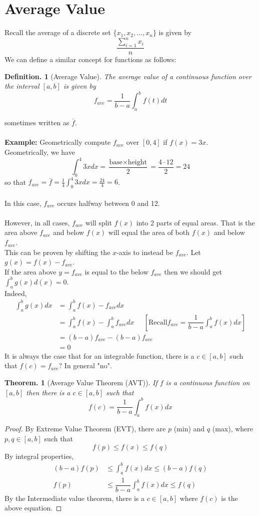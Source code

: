 \documentclass[11pt, a4paper]{memoir}
\theoremstyle{change}
\newtheorem{theorem}{Theorem.}[section]
\theoremstyle{plain}
\theoremstyle{nonumberplain}
\newtheorem{definition}{Definition.}
\newtheorem{proof}{Proof}
\numberwithin{equation}{section}
\begin{document}
\section{Average Value}
Recall the average of a discrete set $\{x_1, x_2, \dots, x_n\}$ is given by $$\dfrac{\sum^n_{i=1}x_i}{n}$$
We can define a similar concept for functions as follows:
\begin{definition}[Average Value]
    The average value of a continuous function over the interval $[a, b]$ is given by $$f_{ave} = \dfrac{1}{b-a}\int^b_a f(t) dt$$
\end{definition}
sometimes written as $\bar{f}$.\\ \; \\
\textbf{Example:}
Geometrically compute $f_{ave}$ over $[0,4]$ if $f(x)=3x$. \\
Geometrically, we have $$\int^4_0 3x dx = \dfrac{\text{base} \times \text{height}}{2} = \dfrac{4 \cdot 12}{2} = 24$$
so that $f_{ave} = \bar{f} = \frac{1}{4} \int^4_0 3x dx = \frac{24}{4} = 6$.\\ \; \\
In this case, $f_{ave}$ occurs halfway between 0 and 12. \\ \: \\
However, in all cases, $f_{ave}$ will split $f(x)$ into 2 parts of equal areas.
That is the area above $f_{ave}$ and below $f(x)$ will equal the area of both $f(x)$ and below $f_{ave}$. \\ 
This can be proven by shifting the $x$-axis to instead be $f_{ave}$. Let $g(x) = f(x) - f_{ave}$.\\
If the area above $y = f_{ave}$ is equal to the below $f_{ave}$ then we should get $\int^b_a g(x)d(x) = 0$. \\
Indeed, 
\begin{align*}
    \int^b_a g(x) dx &= \int^b_a f(x) - f_{ave} dx\\
    &= \int^b_a f(x) - \int^b_a f_{ave}dx \; \; \; \; \; [\text{Recall} f_{ave} = \dfrac{1}{b-a} \int^b_a f(x) dx]\\
    &= (b-a)f_{ave} - (b-a)f_{ave}\\
    &= 0
\end{align*}
It is always the case that for an integrable function, there is a $c \in [a,b]$ such that $f(c) = f_{ave}$? In general "no".\\
\begin{theorem}[Average Value Theorem (AVT)]
    If $f$ is a continuous function on $[a,b]$ then there is a $c \in [a,b]$ such that $$f(c) = \frac{1}{b-a} \int^b_a f(x) dx$$
\end{theorem}
\begin{proof}
    By Extreme Value Theorem (EVT), there are $p$ (min) and $q$ (max), where $p, q \in [a,b]$ such that $$f(p) \le f(x) \le f(q)$$
    By integral properties, 
    \begin{align*}
        (b-a) f(p) &\le \int^b_a f(x) dx \le (b-a)f(q)\\
        f(p) &\le \dfrac{1}{b-a} \int^b_a f(x) dx \le f(q)
    \end{align*}
    By the Intermediate value theorem, there is a $c \in [a, b]$ where $f(c)$ is the above equation.
\end{proof}
\end{document}
